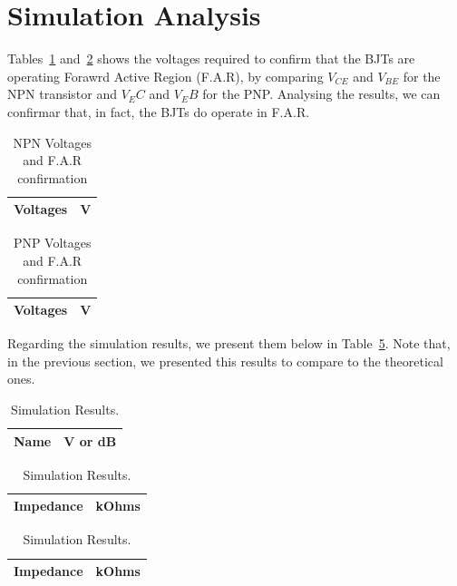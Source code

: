 \section{Simulation Analysis}
\label{sec:simulation}

	Tables~\ref{tab1:npn} and~\ref{tab1:pnp}  shows the voltages required to confirm that the BJTs are operating Forawrd Active Region (F.A.R), 
by comparing $V_{CE}$ and $V_{BE}$ for the NPN transistor and $V_EC$ and $V_EB$ for the PNP. Analysing the results, we can confirmar that, in fact,
the BJTs do operate in F.A.R.

\begin{table}[H]
  \centering
  \begin{tabular}{|l|r|}
    \hline    
    {\bf Voltages} & {\bf V} \\ \hline
    
  \end{tabular}
  \caption{NPN Voltages and F.A.R confirmation}
  \label{tab1:npn}
\end{table}

\begin{table}[H]
  \centering
  \begin{tabular}{|l|r|}
    \hline    
    {\bf Voltages} & {\bf V} \\ \hline
    
  \end{tabular}
  \caption{PNP Voltages and F.A.R confirmation}
  \label{tab1:pnp}
\end{table}


Regarding the simulation results, we present them below in Table~\ref{tab1:sim}.
Note that, in the previous section, we presented this results to compare to the theoretical
ones.

\begin{table}[H]
  \centering
  \begin{tabular}{|l|r|}
    \hline    
    {\bf Name} & {\bf V or dB} \\ \hline
    
  \end{tabular}
  \begin{tabular}{|l|c|}
    \hline
    {\bf Impedance} & {\bf kOhms} \\ \hline
    
  \end{tabular}
  \begin{tabular}{|l|c|}
    \hline
    {\bf Impedance} & {\bf kOhms} \\ \hline
    
  \end{tabular}
    \caption{Simulation Results.}
    \label{tab1:sim}
\end{table}

